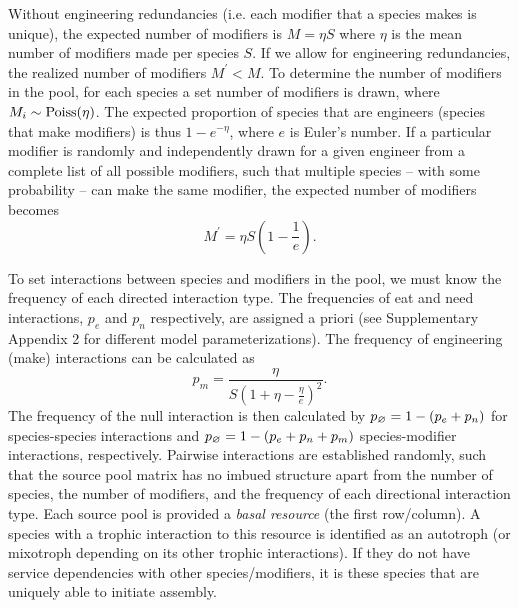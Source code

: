 \documentclass[twocolumn,preprintnumbers,amsmath,amssymb,superscriptaddress,linenumbers]{revtex4-1}
\newcommand{\rr}[1]{{\rm #1}}
\begin{document}
Without engineering redundancies (i.e. each modifier that a species makes is unique), the expected number of modifiers is $M = \eta S$ where $\eta$ is the mean number of modifiers made per species $S$.
If we allow for engineering redundancies, the realized number of modifiers $M^\prime < M$.
To determine the number of modifiers in the pool, for each species a set number of modifiers is drawn, where $M_i \sim {\rm Poiss}(\eta)$.
The expected proportion of species that are engineers (species that make modifiers) is thus $1-{e}^{-\eta}$, where $e$ is Euler's number.
If a particular modifier is randomly and independently drawn for a given engineer from a complete list of all possible modifiers, such that multiple species -- with some probability -- can make the same modifier, the expected number of modifiers becomes
\begin{equation}
M^\prime = \eta S \left(1 - \frac{1}{{e}}\right).
\label{eq:total}
\end{equation}

To set interactions between species and modifiers in the pool, we must know the frequency of each directed interaction type.
The frequencies of eat and need interactions, $p_e$ and $p_n$ respectively, are assigned a priori (see Supplementary Appendix 2 for different model parameterizations).
The frequency of engineering (make) interactions can be calculated as
\begin{equation}
p_m = \frac{\eta}{S\left(1 + \eta - \frac{\eta}{e}\right)^2}.
\end{equation}
The frequency of the null interaction is then calculated by $p_\rr{\varnothing} = 1 - (p_e + p_n)$ for species-species interactions and $p_\rr{\varnothing} = 1 - (p_e + p_n+ p_m)$ species-modifier interactions, respectively.
Pairwise interactions are established randomly, such that the source pool matrix has no imbued structure apart from the number of species, the number of modifiers, and the frequency of each directional interaction type.
Each source pool is provided a \emph{basal resource} (the first row/column).
A species with a trophic interaction to this resource is identified as an autotroph (or mixotroph depending on its other trophic interactions).
If they do not have service dependencies with other species/modifiers, it is these species that are uniquely able to initiate assembly.
\end{document}
